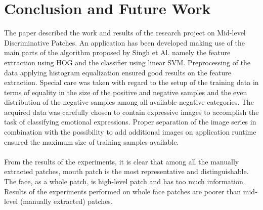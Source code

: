 \section{Conclusion and Future Work}

The paper described the work and results of the research project on Mid-level Discriminative Patches. An application has been developed making use of the main parts of the algorithm proposed by Singh et Al. \cite{Singh2012DiscPat} namely the feature extraction using HOG and the classifier using linear SVM. Preprocessing of the data applying histogram equalization ensured good results on the feature extraction. Special care was taken with regard to the setup of the training data in terms of equality in the size of the positive and negative samples and the even distribution of the negative samples among all available negative categories. The acquired data was carefully chosen to contain expressive images to accomplish the task of classifying emotional expressions. Proper separation of the image series in combination with the possibility to add additional images on application runtime ensured the maximum size of training samples available.
\\
\\
From the results of the experiments, it is clear that among all the manually extracted patches, mouth patch is the most representative and distinguishable. The face, as a whole patch, is high-level patch and has too much information. Results of the experiments performed on whole face patches are poorer than mid-level (manually extracted) patches. 

  